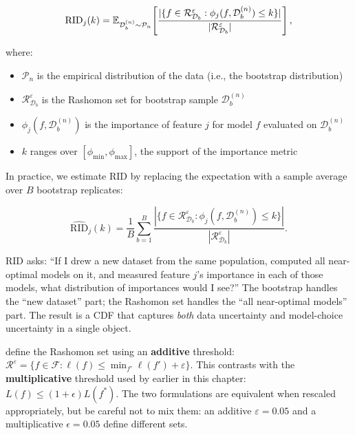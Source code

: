 \begin{equation}\label{eq:rid-formal}
  \text{RID}_j(k)
    = \mathbb{E}_{\mathcal{D}_b^{(n)} \sim \mathcal{P}_n}\!\left[
      \frac{|\{f \in \mathcal{R}_{\mathcal{D}_b}^{\varepsilon}
        : \phi_j(f, \mathcal{D}_b^{(n)}) \leq k\}|}
        {|\mathcal{R}_{\mathcal{D}_b}^{\varepsilon}|}
    \right],
\end{equation}

\noindent where:
\begin{itemize}[leftmargin=1.8em]
  \item $\mathcal{P}_n$ is the empirical distribution of the data (i.e.,
    the bootstrap distribution)
  \item $\mathcal{R}_{\mathcal{D}_b}^{\varepsilon}$ is the Rashomon set
    for bootstrap sample $\mathcal{D}_b^{(n)}$
  \item $\phi_j(f, \mathcal{D}_b^{(n)})$ is the importance of feature $j$
    for model $f$ evaluated on $\mathcal{D}_b^{(n)}$
  \item $k$ ranges over $[\phi_{\min}, \phi_{\max}]$, the support of the
    importance metric
\end{itemize}

In practice, we estimate RID by replacing the expectation with a sample
average over $B$ bootstrap replicates:

\begin{equation}\label{eq:rid-empirical}
  \widehat{\text{RID}}_j(k)
    = \frac{1}{B}\sum_{b=1}^{B}
      \frac{|\{f \in \mathcal{R}_{\mathcal{D}_b}^{\varepsilon}
        : \phi_j(f, \mathcal{D}_b^{(n)}) \leq k\}|}
        {|\mathcal{R}_{\mathcal{D}_b}^{\varepsilon}|}.
\end{equation}

\begin{intuition}
RID asks: ``If I drew a new dataset from the same population, computed all
near-optimal models on it, and measured feature $j$'s importance in each of
those models, what distribution of importances would I see?''  The bootstrap
handles the ``new dataset'' part; the Rashomon set handles the ``all
near-optimal models'' part.  The result is a CDF that captures \emph{both}
data uncertainty and model-choice uncertainty in a single object.
\end{intuition}

\begin{warning}
\citet{DonnellyEtAl2023} define the Rashomon set using an
\textbf{additive} threshold: $\mathcal{R}^{\varepsilon} = \{f \in
\mathcal{F} : \ell(f) \leq \min_{f'}\ell(f') + \varepsilon\}$.  This
contrasts with the \textbf{multiplicative} threshold used by
\citet{XinEtAl2022} earlier in this chapter: $L(f) \leq (1 + \epsilon)
L(f^*)$.  The two formulations are equivalent when rescaled appropriately,
but be careful not to mix them: an additive $\varepsilon = 0.05$ and a
multiplicative $\epsilon = 0.05$ define different sets.
\end{warning}

